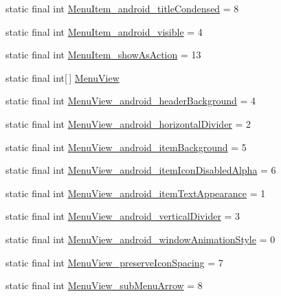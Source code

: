 \begin{CompactItemize}
\item 
static final int \hyperlink{classandroid_1_1support_1_1v4_1_1_r_1_1styleable_893c55eac75b4f4c10023c8c9326e6ee}{MenuItem\_\-android\_\-titleCondensed} = 8
\item 
static final int \hyperlink{classandroid_1_1support_1_1v4_1_1_r_1_1styleable_f5ec2e318cacb05a88574400015d117b}{MenuItem\_\-android\_\-visible} = 4
\item 
static final int \hyperlink{classandroid_1_1support_1_1v4_1_1_r_1_1styleable_97f9c113efa1633c7665e13fd89ade63}{MenuItem\_\-showAsAction} = 13
\item 
static final int\mbox{[}$\,$\mbox{]} \hyperlink{classandroid_1_1support_1_1v4_1_1_r_1_1styleable_f27b70b4d764f1a1f59531c58e843a3b}{MenuView}
\item 
static final int \hyperlink{classandroid_1_1support_1_1v4_1_1_r_1_1styleable_64d916065b7bff29e75fd9d984101ef0}{MenuView\_\-android\_\-headerBackground} = 4
\item 
static final int \hyperlink{classandroid_1_1support_1_1v4_1_1_r_1_1styleable_c6c0a8c4be773bbaff1bdb2cd894c2ab}{MenuView\_\-android\_\-horizontalDivider} = 2
\item 
static final int \hyperlink{classandroid_1_1support_1_1v4_1_1_r_1_1styleable_9fd625d2301e72bc9b04d2fca592d709}{MenuView\_\-android\_\-itemBackground} = 5
\item 
static final int \hyperlink{classandroid_1_1support_1_1v4_1_1_r_1_1styleable_020f8607a79d9f432c3dc7dda196136b}{MenuView\_\-android\_\-itemIconDisabledAlpha} = 6
\item 
static final int \hyperlink{classandroid_1_1support_1_1v4_1_1_r_1_1styleable_f5aae86805e86421e406c3299856bfae}{MenuView\_\-android\_\-itemTextAppearance} = 1
\item 
static final int \hyperlink{classandroid_1_1support_1_1v4_1_1_r_1_1styleable_463a5ddae67100490816566a6e87082b}{MenuView\_\-android\_\-verticalDivider} = 3
\item 
static final int \hyperlink{classandroid_1_1support_1_1v4_1_1_r_1_1styleable_2235933d1e99168194dc75356546ce5f}{MenuView\_\-android\_\-windowAnimationStyle} = 0
\item 
static final int \hyperlink{classandroid_1_1support_1_1v4_1_1_r_1_1styleable_1a86f6ebd0fdcf4d5eadc06edfcd42c6}{MenuView\_\-preserveIconSpacing} = 7
\item 
static final int \hyperlink{classandroid_1_1support_1_1v4_1_1_r_1_1styleable_4e42622f8c86c7431121ce63d8486454}{MenuView\_\-subMenuArrow} = 8
\item 

\end{CompactItemize}
